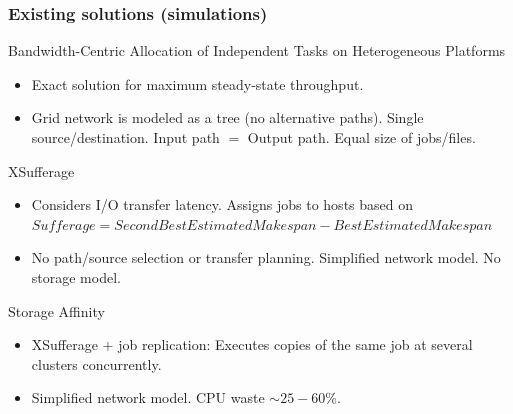 \documentclass{beamer}
\begin{document}
\begin{frame}\frametitle{Existing solutions (simulations)} 	
\begin{footnotesize}
\begin{block}{Bandwidth-Centric Allocation of Independent Tasks on Heterogeneous Platforms \cite{Trees}}  
		\begin{itemize}
			\item Exact solution for maximum steady-state throughput. 
			\item Grid network is modeled as a tree (no alternative paths). Single source/destination. Input path $=$ Output path. Equal size of jobs/files.		
		\end{itemize}
 	\end{block}

\begin{block}{XSufferage \cite{casanova2000heuristics}
}	
\begin{itemize}
 	 \item Considers I/O transfer latency. Assigns jobs to hosts based on $Sufferage = SecondBestEstimatedMakespan - BestEstimatedMakespan$
 	 \item No path/source selection or transfer planning. Simplified network model. No storage model.
 	 \end{itemize}
\end{block}  	
 	
 	
\begin{block}{Storage Affinity \cite{santos2005exploiting}}	
	 \begin{itemize}
	 \item XSufferage + job replication: Executes copies of the same job at several clusters concurrently.
	 \item Simplified network model. CPU waste $\sim 25-60$\%.
 	  \end{itemize}
\end{block}

	 
\end{footnotesize}
\end{frame}
\end{document}
